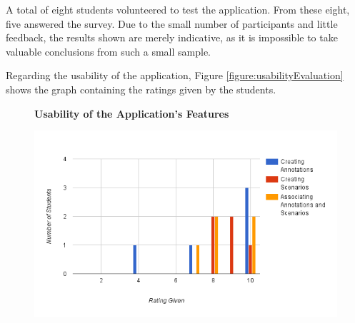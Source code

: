 \documentclass[conference]{IEEEtran}
\begin{document}
A total of eight students volunteered to test the application. From these eight, five answered the survey. Due to the small number of participants and little feedback, the results shown are merely indicative, as it is impossible to take valuable conclusions from such a small sample.

Regarding the usability of the application, Figure \ref{figure:usabilityEvaluation} shows the graph containing the ratings given by the students.

\begin{figure}[h]
\centering
\begin{normalsize}
\textbf{Usability of the Application's Features}\\
\end{normalsize}
%
\includegraphics[scale=0.4]{images/graph1}

\end{figure}
\end{document}
